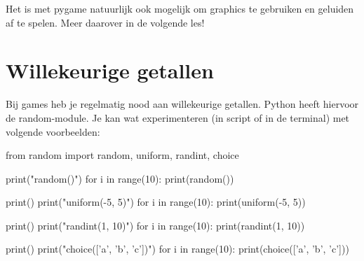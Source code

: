 \documentclass[10pt,a4paper]{article}
\begin{document}
Het is met pygame natuurlijk ook mogelijk om graphics te gebruiken en geluiden af te spelen. Meer daarover in de volgende les!

\newpage
\section{Willekeurige getallen}

Bij games heb je regelmatig nood aan willekeurige getallen. Python heeft hiervoor de random-module. Je kan wat experimenteren (in script of in de terminal) met volgende voorbeelden:

\begin{python}
from random import random, uniform, randint, choice

print("random()")
for i in range(10):
	print(random())

print()
print("uniform(-5, 5)")
for i in range(10):
	print(uniform(-5, 5))

print()
print("randint(1, 10)")
for i in range(10):
	print(randint(1, 10))

print()
print("choice(['a', 'b', 'c'])")
for i in range(10):
	print(choice(['a', 'b', 'c']))
\end{python}
\end{document}
